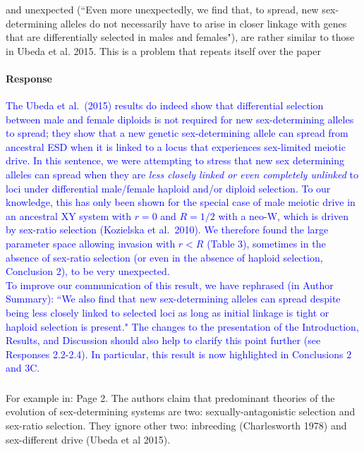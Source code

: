\documentclass[10pt,letterpaper]{article}
\begin{document}
\noindent\subsubsection{}
\noindent and unexpected (``Even more unexpectedly, we find that, to spread, new sex-determining alleles do not necessarily have to arise in closer linkage with genes that are differentially selected in males and females"), are rather similar to those in Ubeda et al. 2015. This is a problem that repeats itself over the paper 

\noindent\paragraph{Response}
\textcolor{blue}{
The Ubeda et al.\ (2015) results do indeed show that differential selection between male and female diploids is not required for new sex-determining alleles to spread; they show that a new genetic sex-determining allele can spread from ancestral ESD when it is linked to a locus that experiences sex-limited meiotic drive. 
In this sentence, we were attempting to stress that new sex determining alleles can spread when they are \textit{less closely linked or even completely unlinked} to loci under differential male/female haploid and/or diploid selection. 
To our knowledge, this has only been shown for the special case of male meiotic drive in an ancestral XY system with $r=0$ and $R=1/2$ with a neo-W, which is driven by sex-ratio selection (Kozielska et al.\ 2010). 
We therefore found the large parameter space allowing invasion with $r<R$ (Table 3), sometimes in the absence of sex-ratio selection (or even in the absence of haploid selection, Conclusion 2), to be very unexpected.
\\
\indent
To improve our communication of this result, we have rephrased (in Author Summary): ``We also find that new sex-determining alleles can spread despite being less closely linked to selected loci as long as initial linkage is tight or haploid selection is present." 
The changes to the presentation of the Introduction, Results, and Discussion should also help to clarify this point further (see Responses 2.2-2.4). 
In particular, this result is now highlighted in Conclusions 2 and 3C.
}

\noindent\subsubsection{}
For example in: Page 2. The authors claim that predominant theories of the evolution of sex-determining systems are two: sexually-antagonistic selection and sex-ratio selection. They ignore other two: inbreeding (Charlesworth 1978) and sex-different drive (Ubeda et al 2015). 
\end{document}
